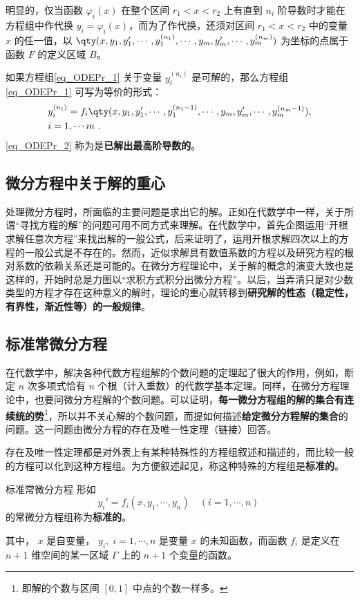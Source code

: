 明显的，仅当函数 $\varphi_i(x)$ 在整个区间 $r_1<x<r_2$ 上有直到 $n_i$ 阶导数时才能在方程组中作代换 $y_i=\varphi_i(x)$，而为了作代换，还须对区间 $r_1<x<r_2$ 中的变量 $x$ 的任一值，以 $\qty(x,y_1,y_1',\cdots,y_1^{(n_1)},\cdots,y_m,y_m',\cdots,y_m^{(n_m)})$ 为坐标的点属于函数 $F$ 的定义区域 $B$。

如果方程组\autoref{eq_ODEPr_1} 关于变量 $y_i^{(n_i)}$ 是可解的，那么方程组\autoref{eq_ODEPr_1} 可写为等价的形式： 
\begin{equation}\label{eq_ODEPr_2}
\begin{aligned}
&y_i^{(n_i)}=f_i\qty(x,y_1,y_1',\cdots,y_1^{(n_1-1)},\cdots,y_m,y_m',\cdots,y_m^{(n_m-1)}),\\
& i=1,\cdots m~.
\end{aligned}
\end{equation}
\autoref{eq_ODEPr_2} 称为是\textbf{已解出最高阶导数的}。
\subsection{微分方程中关于解的重心}
处理微分方程时，所面临的主要问题是求出它的解。正如在代数学中一样，关于所谓“寻找方程的解”的问题可用不同方式来理解。在代数学中，首先企图运用“开根求解任意次方程”来找出解的一般公式，后来证明了，运用开根求解四次以上的方程的一般公式是不存在的。然而，近似求解具有数值系数的方程以及研究方程的根对系数的依赖关系还是可能的。在微分方程理论中，关于解的概念的演变大致也是这样的，开始时总是力图以“求积方式积分出微分方程”。以后，当弄清只是对少数类型的方程才存在这种意义的解时，理论的重心就转移到\textbf{研究解的性态（稳定性，有界性，渐近性等）的一般规律}。
\subsection{标准常微分方程}\label{sub_ODEPr_1}
在代数学中，解决各种代数方程组解的个数问题的定理起了很大的作用，例如，断定 $n$ 次多项式恰有 $n$ 个根（计入重数）的代数学基本定理。同样，在微分方程理论中，也要问微分方程解的个数问题。可以证明，\textbf{每一微分方程组的解的集合有连续统的势}\footnote{即解的个数与区间 $[0,1]$ 中点的个数一样多。}，所以并不关心解的个数问题，而提如何描述\textbf{给定微分方程解的集合}的问题。这一问题由微分方程的存在及唯一性定理（链接）回答。

存在及唯一性定理都是对外表上有某种特殊性的方程组叙述和描述的，而比较一般的方程可以化到这种方程组。为方便叙述起见，称这种特殊的方程组是\textbf{标准的}。

\begin{definition}{标准常微分方程}\label{def_ODEPr_1}
形如
\begin{equation}
y_i'=f_i(x,y_1,\cdots,y_n)\quad (i=1,\cdots,n)~
\end{equation}
的常微分方程组称为\textbf{标准的}。

其中， $x$ 是自变量， $y_i,\; i=1,\cdots, n$ 是变量 $x$ 的未知函数，而函数 $f_i$ 是定义在 $n+1$ 维空间的某一区域 $\Gamma$ 上的 $n+1$ 个变量的函数。
\end{definition}


